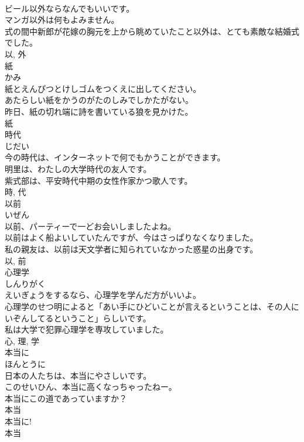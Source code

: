 \documentclass[8pt]{extreport}
\begin{document}
\begin{CJK}{UTF8}{min}
\\	ビール以外ならなんでもいいです。	
\\	マンガ以外は何もよみません。	
\\	式の間中新郎が花嫁の胸元を上から眺めていたこと以外は、とても素敵な結婚式でした。	
\\	以, 外	
\\	紙	
\\	かみ	
\\	紙とえんぴつとけしゴムをつくえに出してください。	
\\	あたらしい紙をかうのがたのしみでしかたがない。	
\\	昨日、紙の切れ端に詩を書いている狼を見かけた。	
\\	紙	
\\	時代	
\\	じだい	
\\	今の時代は、インターネットで何でもかうことができます。	
\\	明里は、わたしの大学時代の友人です。	
\\	紫式部は、平安時代中期の女性作家かつ歌人です。	
\\	時, 代	
\\	以前	
\\	いぜん	
\\	以前、パーティーで一どお会いしましたよね。	
\\	以前はよく船よいしていたんですが、今はさっぱりなくなりました。	
\\	私の親友は、以前は天文学者に知られていなかった惑星の出身です。	
\\	以, 前	
\\	心理学	
\\	しんりがく	
\\	えいぎょうをするなら、心理学を学んだ方がいいよ。	
\\	心理学のせつ明によると「あい手にひどいことが言えるということは、その人にいぞんしてるということ」らしいです。	
\\	私は大学で犯罪心理学を専攻していました。	
\\	心, 理, 学	
\\	本当に	
\\	ほんとうに	
\\	日本の人たちは、本当にやさしいです。	
\\	このせいひん、本当に高くなっちゃったねー。	
\\	本当にこの道であっていますか？	
\\	本当 
\\	本当に! 
\\	本当 

\end{CJK}
\end{document}
